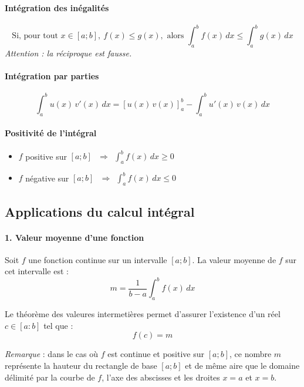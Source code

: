 \documentclass{report}
\begin{document}
      \paragraph{Intégration des inégalités}
      \[
      \text{Si, pour tout } x \in [a ; b],~ f(x) \leq g(x), \text{ alors } \int_a^b f(x)\, dx \leq \int_a^b g(x)\, dx
      \]
      \textit{Attention : la réciproque est fausse.}

      \paragraph{Intégration par parties}
        \[
        \boxed{\int_a^b u(x)\,v'(x)\, dx = \left[ u(x)\,v(x) \right]_a^b - \int_a^b u'(x)\,v(x)\, dx}
        \]

      \paragraph{Positivité de l'intégral}
        \begin{itemize}
          \item $f$ positive sur $[a ; b] ~~~ \Rightarrow ~~ \int_a^b f(x)\, dx \geq 0$
          \item $f$ négative sur $[a ; b] ~~~ \Rightarrow ~~ \int_a^b f(x)\, dx \leq 0$
        \end{itemize}

      \newpage

      \subsection{Applications du calcul intégral}

      \paragraph{1. Valeur moyenne d'une fonction}
      Soit \( f \) une fonction continue sur un intervalle \( [a ; b] \). La valeur moyenne de \( f \) sur cet intervalle est :
      \[
      m = \frac{1}{b - a} \int_a^b f(x)\, dx
      \]

      Le théorème des valeures intermetières permet d'assurer l'existence d'un réel $c \in \left[a:b\right]$ tel que : 
      \[f(c) = m\]

      \textit{Remarque} : dans le cas où \( f \) est continue et positive sur \( [a ; b] \), ce nombre \( m \) représente la hauteur du rectangle de base \( [a ; b] \) et de même aire que le domaine délimité par la courbe de \( f \), l’axe des abscisses et les droites \( x = a \) et \( x = b \).
\end{document}
